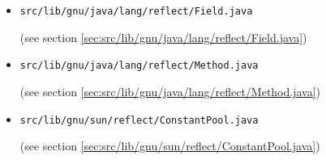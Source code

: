 \documentclass[a4paper, 10pt, titlepage]{scrartcl} %
\begin{document}
\begin{itemize}
 \item \begin{scriptsize}\verb|src|\hspace{0.0pt}\verb|/|\hspace{0.0pt}\verb|lib|\hspace{0.0pt}\verb|/|\hspace{0.0pt}\verb|gnu|\hspace{0.0pt}\verb|/|\hspace{0.0pt}\verb|java|\hspace{0.0pt}\verb|/|\hspace{0.0pt}\verb|lang|\hspace{0.0pt}\verb|/|\hspace{0.0pt}\verb|reflect|\hspace{0.0pt}\verb|/|\hspace{0.0pt}\verb|Field|\hspace{0.0pt}\verb|.|\hspace{0.0pt}\verb|java|\end{scriptsize} (see section \ref{sec:src/lib/gnu/java/lang/reflect/Field.java})
 \item \begin{scriptsize}\verb|src|\hspace{0.0pt}\verb|/|\hspace{0.0pt}\verb|lib|\hspace{0.0pt}\verb|/|\hspace{0.0pt}\verb|gnu|\hspace{0.0pt}\verb|/|\hspace{0.0pt}\verb|java|\hspace{0.0pt}\verb|/|\hspace{0.0pt}\verb|lang|\hspace{0.0pt}\verb|/|\hspace{0.0pt}\verb|reflect|\hspace{0.0pt}\verb|/|\hspace{0.0pt}\verb|Method|\hspace{0.0pt}\verb|.|\hspace{0.0pt}\verb|java|\end{scriptsize} (see section \ref{sec:src/lib/gnu/java/lang/reflect/Method.java})
 \item \begin{scriptsize}\verb|src|\hspace{0.0pt}\verb|/|\hspace{0.0pt}\verb|lib|\hspace{0.0pt}\verb|/|\hspace{0.0pt}\verb|gnu|\hspace{0.0pt}\verb|/|\hspace{0.0pt}\verb|sun|\hspace{0.0pt}\verb|/|\hspace{0.0pt}\verb|reflect|\hspace{0.0pt}\verb|/|\hspace{0.0pt}\verb|ConstantPool|\hspace{0.0pt}\verb|.|\hspace{0.0pt}\verb|java|\end{scriptsize} (see section \ref{sec:src/lib/gnu/sun/reflect/ConstantPool.java})

\end{itemize}
\end{document}
